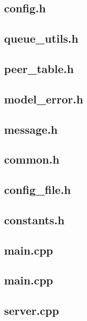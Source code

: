 \subsection*{config.h}
\scriptsize
\subsection*{queue_utils.h}
\scriptsize
\subsection*{peer_table.h}
\scriptsize
\subsection*{model_error.h}
\scriptsize
\subsection*{message.h}
\scriptsize
\subsection*{common.h}
\scriptsize
\subsection*{config_file.h}
\scriptsize
\subsection*{constants.h}
\scriptsize
\subsection*{main.cpp}
\scriptsize
\subsection*{main.cpp}
\scriptsize
\subsection*{server.cpp}
\scriptsize

